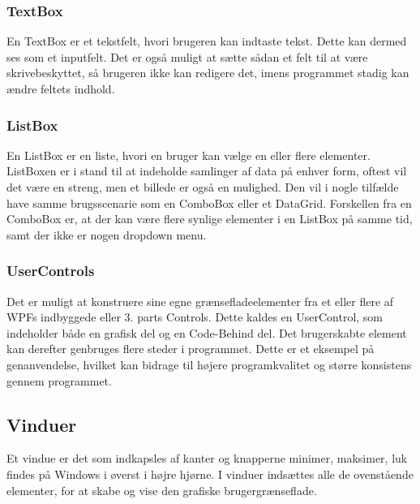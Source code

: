 \subsubsection*{TextBox}
En TextBox er et tekstfelt, hvori brugeren kan indtaste tekst. 
Dette kan dermed ses som et inputfelt. 
Det er også muligt at sætte sådan et felt til at være skrivebeskyttet, så brugeren ikke kan redigere det, imens programmet stadig kan ændre feltets indhold.

\subsubsection*{ListBox}
En ListBox er en liste, hvori en bruger kan vælge en eller flere elementer.
ListBoxen er i stand til at indeholde samlinger af data på enhver form, oftest vil det være en streng, men et billede er også en mulighed.
Den vil i nogle tilfælde have samme brugsscenarie som en ComboBox eller et DataGrid. 
Forskellen fra en ComboBox er, at der kan være flere synlige elementer i en ListBox på samme tid, samt der ikke er nogen dropdown menu.

\subsubsection*{UserControls}
Det er muligt at konstruere sine egne grænsefladeelementer fra et eller flere af WPFs indbyggede eller 3. parts Controls.
Dette kaldes en UserControl, som indeholder både en grafisk del og en Code-Behind del.
Det brugerskabte element kan derefter genbruges flere steder i programmet.
Dette er et eksempel på genanvendelse, hvilket kan bidrage til højere programkvalitet og større konsistens gennem programmet. 

\subsection*{Vinduer}
Et vindue er det som indkapsles af kanter og knapperne minimer, maksimer, luk findes på Windows i øverst i højre hjørne.
I vinduer indsættes alle de ovenstående elementer, for at skabe og vise den grafiske brugergrænseflade.
